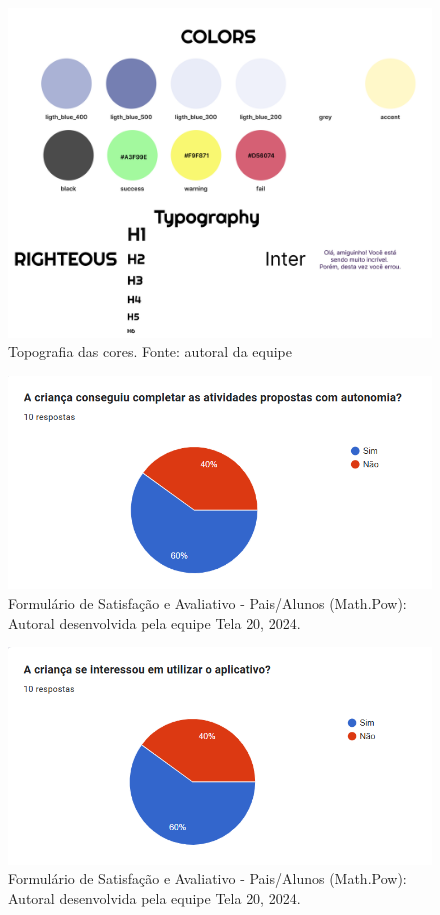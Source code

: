 \documentclass[12pt, openany, oneside, a4paper, english, brazil]{abntex2}   %
\begin{document}
\begin{figure}[h!]
    \centering
    \includegraphics[width=0.8\linewidth]{figuras/Math.Pow App/Topografia.png}
    \caption{Topografia das cores. Fonte: autoral da equipe}
    \label{fig:Figma}
\end{figure}

\begin{figure}
    \centering
    \includegraphics[width=0.8\linewidth]{figuras/Formulário Gráficos/Pais/1 A crianca conseguiu completar as atividades propostas com autonomia.png}
    \caption{Formulário de Satisfação e Avaliativo  - Pais/Alunos (Math.Pow):  Autoral desenvolvida pela equipe Tela 20, 2024.}
    \label{gráfico gerado pelo formulário}
\end{figure}

\begin{figure}
    \centering
    \includegraphics{figuras/Formulário Gráficos/Pais/2 A crianca se interessou em utilizar o aplicativo.png}
    \caption{Formulário de Satisfação e Avaliativo  - Pais/Alunos (Math.Pow):  Autoral desenvolvida pela equipe Tela 20, 2024.}
    \label{gráfico gerado pelo formulário}
\end{figure}
\end{document}
